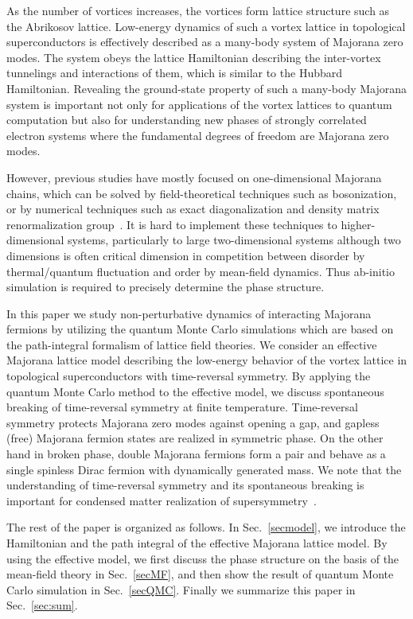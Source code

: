 \documentclass[aps,prb,superscriptaddress,twocolumn]{revtex4-1}
\begin{document}
As the number of vortices increases, the vortices form lattice structure such as the Abrikosov lattice.
Low-energy dynamics of such a vortex lattice in topological superconductors is effectively described as a many-body system of Majorana zero modes.
The system obeys the lattice Hamiltonian describing the inter-vortex tunnelings and interactions of them, which is similar to the Hubbard Hamiltonian.
Revealing the ground-state property of such a many-body Majorana system is important not only for applications of the vortex lattices to quantum computation
but also for understanding new phases of strongly correlated electron systems where the fundamental degrees of freedom are Majorana zero modes.

However, previous studies have mostly focused on one-dimensional Majorana chains, which can be solved by field-theoretical techniques such as bosonization, or by numerical techniques such as exact diagonalization and density matrix renormalization group~\cite{Grover280,PhysRevLett.115.166401,PhysRevB.92.235123,PhysRevB.91.165402,PhysRevB.92.115137}.
It is hard to implement these techniques to higher-dimensional systems, particularly to large two-dimensional systems although two dimensions is often critical dimension in competition between disorder by thermal/quantum fluctuation and order by mean-field dynamics.
Thus ab-initio simulation is required to precisely determine the phase structure.

In this paper we study non-perturbative dynamics of interacting Majorana fermions by utilizing the quantum Monte Carlo simulations which are based on the path-integral formalism of lattice field theories.
We consider an effective Majorana lattice model describing the low-energy behavior of the vortex lattice in topological superconductors with time-reversal symmetry.
By applying the quantum Monte Carlo method to the effective model, we discuss spontaneous breaking of time-reversal symmetry at finite temperature.
Time-reversal symmetry protects Majorana zero modes  against opening a gap, and gapless (free) Majorana fermion states are realized in symmetric phase.
On the other hand in broken phase, double Majorana fermions form a pair and behave as a single spinless Dirac fermion with dynamically generated mass.
We note that the understanding of time-reversal symmetry and its spontaneous breaking is important for condensed matter realization of supersymmetry~\cite{Grover280,PhysRevLett.115.166401,PhysRevB.92.235123}.

The rest of the paper is organized as follows.
In Sec.~\ref{secmodel}, we introduce the Hamiltonian and the path integral of the effective Majorana lattice model.
By using the effective model, we first discuss the phase structure on the basis of the mean-field theory in Sec.~\ref{secMF}, 
and then show the result of quantum Monte Carlo simulation in Sec.~\ref{secQMC}.
Finally we summarize this paper in Sec.~\ref{sec:sum}.
\end{document}
